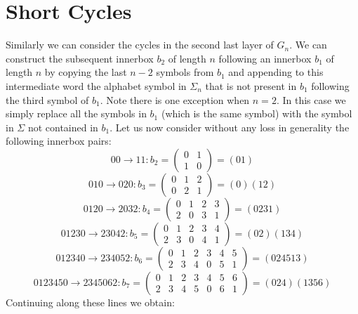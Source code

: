 \documentclass[a4paper,10pt]{article}
\theoremstyle{definition}
\begin{document}
\section{Short Cycles}
Similarly we can consider the cycles in the second last layer of $G_n$. We can construct the subsequent innerbox $b_2$ of length $n$ following an innerbox $b_1$ of length $n$ by copying the last $n-2$ symbols from $b_1$ and appending to this intermediate word the alphabet symbol in $\Sigma_n$ that is not present in $b_1$ following the third symbol of $b_1$. Note there is one exception when $n=2$. In this case we simply replace all the symbols in $b_1$ (which is the same symbol) with the symbol in $\Sigma$ not contained in $b_1$. Let us now consider without any loss in generality the following innerbox pairs:
\begin{equation}
00\rightarrow11:b_2=
\begin{pmatrix}
0&1\\
1&0
\end{pmatrix} = (01)
\end{equation}
\begin{equation}
010\rightarrow020:b_3=
\begin{pmatrix}
0&1&2\\
0&2&1
\end{pmatrix} = (0)(12)
\end{equation}
\begin{equation}
0120\rightarrow2032:b_4=
\begin{pmatrix}
0&1&2&3\\
2&0&3&1
\end{pmatrix} = (0231)
\end{equation}
\begin{equation}
01230\rightarrow23042:b_5=
\begin{pmatrix}
0&1&2&3&4\\
2&3&0&4&1
\end{pmatrix} = (02)(134)
\end{equation}
\begin{equation}
012340\rightarrow234052:b_6=
\begin{pmatrix}
0&1&2&3&4&5\\
2&3&4&0&5&1
\end{pmatrix} = (024513)
\end{equation}
\begin{equation}
0123450\rightarrow2345062:b_7=
\begin{pmatrix}
0&1&2&3&4&5&6\\
2&3&4&5&0&6&1
\end{pmatrix} = (024)(1356)
\end{equation}
Continuing along these lines we obtain:
\end{document}
